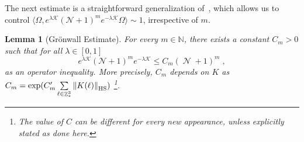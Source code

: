 \documentclass[12pt,a4paper]{article}
\numberwithin{equation}{section}
\newcommand{\cK}{\mathcal{K}}
\newcommand{\NNN}{\mathbb{N}}
\newcommand{\1}{\mathbb{I}}
\newcommand{\HS}{\mathrm{HS}}
\DeclareMathOperator{\Z}{\mathbb{Z}}
\DeclareMathOperator{\NN}{\mathcal{N}}
\theoremstyle{plain}
\newtheorem{lemma}[theorem]{Lemma}
\theoremstyle{definition}
\theoremstyle{remark}
\theoremstyle{plain}
\theoremstyle{definition}
\theoremstyle{remark}
\begin{document}
The next estimate is a straightforward generalization of~\cite[Prop.~5.8]{CHN21}, which allows us to control $ \langle \Omega, e^{\lambda \cK} (\mathcal{N} + 1)^m e^{-\lambda \cK} \Omega \rangle \sim 1 $, irrespective of $ m $.

\begin{lemma}[Gr\"onwall Estimate]\label{lem:gronNest}
For every $ m \in \NNN $, there exists a constant $ C_m > 0 $ such that for all $ \lambda\in [0,1]$
\begin{equation}\label{eq:gronest}
	e^{\lambda \cK} (\mathcal{N} +1)^m e^{-\lambda \cK}
	\leq C_m (\NN+1)^m \;,
\end{equation}
as an operator inequality. More precisely, $ C_m $ depends on $ K $ as $C_m = \mathrm{exp}(C'_m\sum\limits_{\ell \in \Z^3_*} \norm{K(\ell)}_{\HS}) $ 
\footnote{The value of $C$ can be different for every new appearance, unless explicitly stated as done here.}.
\end{lemma}
\end{document}
